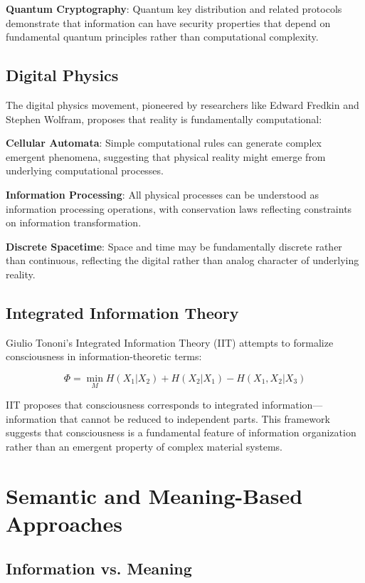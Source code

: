 \documentclass[12pt]{article}
\begin{document}
\textbf{Quantum Cryptography}: Quantum key distribution and related protocols demonstrate that information can have security properties that depend on fundamental quantum principles rather than computational complexity.

\subsection{Digital Physics}

The digital physics movement, pioneered by researchers like Edward Fredkin and Stephen Wolfram, proposes that reality is fundamentally computational:

\textbf{Cellular Automata}: Simple computational rules can generate complex emergent phenomena, suggesting that physical reality might emerge from underlying computational processes.

\textbf{Information Processing}: All physical processes can be understood as information processing operations, with conservation laws reflecting constraints on information transformation.

\textbf{Discrete Spacetime}: Space and time may be fundamentally discrete rather than continuous, reflecting the digital rather than analog character of underlying reality.

\subsection{Integrated Information Theory}

Giulio Tononi's Integrated Information Theory (IIT) attempts to formalize consciousness in information-theoretic terms:

\begin{equation}
\Phi = \min_{M} H(X_1|X_2) + H(X_2|X_1) - H(X_1,X_2|X_3)
\end{equation}

IIT proposes that consciousness corresponds to integrated information—information that cannot be reduced to independent parts. This framework suggests that consciousness is a fundamental feature of information organization rather than an emergent property of complex material systems.

\section{Semantic and Meaning-Based Approaches}

\subsection{Information vs. Meaning}
\end{document}
